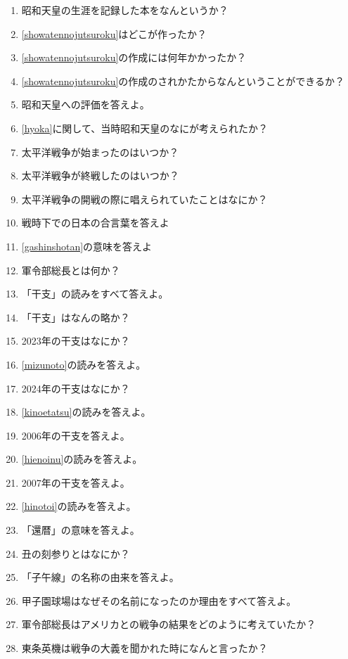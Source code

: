 \documentclass[]{jsarticle}
\begin{document}
\begin{enumerate}
	      \\
	\item 昭和天皇の生涯を記録した本をなんというか？\label{showatennojutsuroku}
	\item \ref{showatennojutsuroku}はどこが作ったか？
	\item \ref{showatennojutsuroku}の作成には何年かかったか？
	\item \ref{showatennojutsuroku}の作成のされかたからなんということができるか？
	\item 昭和天皇への評価を答えよ。\label{hyoka}
	\item \ref{hyoka}に関して、当時昭和天皇のなにが考えられたか？
	\item 太平洋戦争が始まったのはいつか？
	\item 太平洋戦争が終戦したのはいつか？
	\item 太平洋戦争の開戦の際に唱えられていたことはなにか？
	\item 戦時下での日本の合言葉を答えよ\label{gashinshotan}
	\item \ref{gashinshotan}の意味を答えよ
	\item 軍令部総長とは何か？
	\\
	\item 「干支」の読みをすべて答えよ。
	\item 「干支」はなんの略か？\
	\item 2023年の干支はなにか？\label{mizunoto}
	\item \ref{mizunoto}の読みを答えよ。
	\item 2024年の干支はなにか？\label{kinoetatsu}
	\item \ref{kinoetatsu}の読みを答えよ。
	\item 2006年の干支を答えよ。\label{hienoinu}
	\item \ref{hienoinu}の読みを答えよ。
	\item 2007年の干支を答えよ。\label{hinotoi}
	\item \ref{hinotoi}の読みを答えよ。
	\item 「還暦」の意味を答えよ。
	\item 丑の刻参りとはなにか？
	\item 「子午線」の名称の由来を答えよ。
	\item 甲子園球場はなぜその名前になったのか理由をすべて答えよ。
	\\
	\item 軍令部総長はアメリカとの戦争の結果をどのように考えていたか？
	\item 東条英機は戦争の大義を聞かれた時になんと言ったか？

\end{enumerate}
\end{document}

